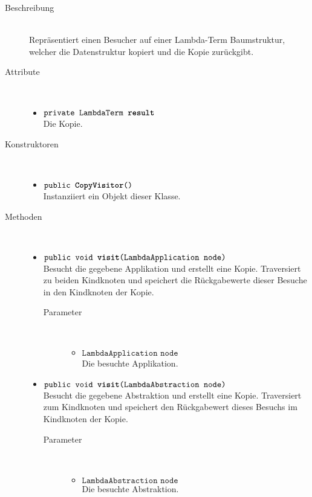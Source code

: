 \begin{description}
\item[Beschreibung] \hfill \\ Repräsentiert einen Besucher auf einer Lambda-Term Baumstruktur, welcher die Datenstruktur kopiert und die Kopie zurückgibt.

\item[Attribute] \hfill \\
	\vspace{-.8cm}
	\begin{itemize}
		\item $\texttt{private LambdaTerm \textbf{result}}$ \\ Die Kopie.
	\end{itemize}

\item[Konstruktoren] \hfill \\
	\vspace{-.8cm}
	\begin{itemize}
		\item $\texttt{public \textbf{CopyVisitor}()}$ \\ Instanziiert ein Objekt dieser Klasse.
	\end{itemize}

\item[Methoden] \hfill \\
	\vspace{-.8cm}
	\begin{itemize}
		\item $\texttt{public void \textbf{visit}(LambdaApplication node)}$ \\ Besucht die gegebene Applikation und erstellt eine Kopie. Traversiert zu beiden Kindknoten und speichert die Rückgabewerte dieser Besuche in den Kindknoten der Kopie.
		\begin{description}
			\item[Parameter] \hfill \\
			\vspace{-.8cm}
			\begin{itemize}
				\item $\texttt{LambdaApplication node}$ \\ Die besuchte Applikation.
			\end{itemize}
		\end{description}
		
		\item $\texttt{public void \textbf{visit}(LambdaAbstraction node)}$ \\ Besucht die gegebene Abstraktion und erstellt eine Kopie. Traversiert zum Kindknoten und speichert den Rückgabewert dieses Besuchs im Kindknoten der Kopie.
		\begin{description}
			\item[Parameter] \hfill \\
			\vspace{-.8cm}
			\begin{itemize}
				\item $\texttt{LambdaAbstraction node}$ \\ Die besuchte Abstraktion.
			\end{itemize}
		\end{description}
		

\end{itemize}
\end{description}
